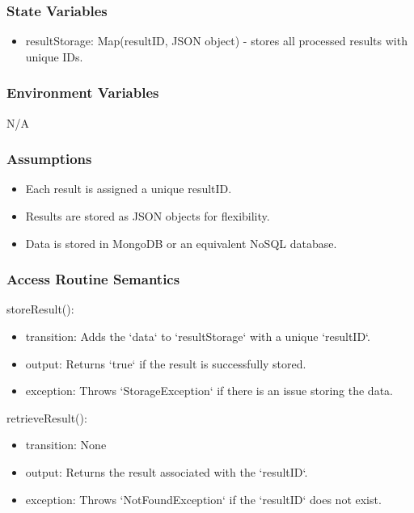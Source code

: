 \documentclass[12pt, titlepage]{article}
\begin{document}
\subsubsection{State Variables}

\begin{itemize}
\item resultStorage: Map(resultID, JSON object) - stores all processed results with unique IDs.
\end{itemize}

\subsubsection{Environment Variables}

N/A

\subsubsection{Assumptions}

\begin{itemize}
\item Each result is assigned a unique resultID.
\item Results are stored as JSON objects for flexibility.
\item Data is stored in MongoDB or an equivalent NoSQL database.
\end{itemize}

\subsubsection{Access Routine Semantics}

\noindent storeResult():
\begin{itemize}
\item transition: Adds the `data` to `resultStorage` with a unique `resultID`.
\item output: Returns `true` if the result is successfully stored.
\item exception: Throws `StorageException` if there is an issue storing the data.
\end{itemize}

\noindent retrieveResult():
\begin{itemize}
\item transition: None
\item output: Returns the result associated with the `resultID`.
\item exception: Throws `NotFoundException` if the `resultID` does not exist.
\end{itemize}
\end{document}
